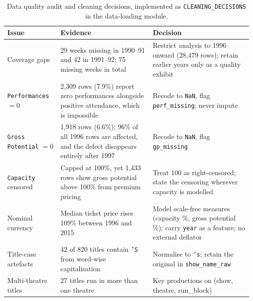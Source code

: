 \documentclass[11pt,a4paper]{article}
\newcommand{\code}[1]{\texttt{\small #1}}
\begin{document}
\begin{table}[htbp]
\centering
\caption{Data quality audit and cleaning decisions, implemented as
\code{CLEANING\_DECISIONS} in the data-loading module.}
\label{tab:quality}
\small
\begin{tabular}{@{}p{2.9cm}p{4.6cm}p{6.4cm}@{}}
\toprule
\textbf{Issue} & \textbf{Evidence} & \textbf{Decision} \\
\midrule
Coverage gaps &
29 weeks missing in 1990--91 and 42 in 1991--92; 75 missing weeks in total &
Restrict analysis to 1996 onward (28{,}479 rows); retain earlier years only as
a quality exhibit \\[3pt]

\code{Performances} $=0$ &
2{,}309 rows (7.9\%) report zero performances alongside positive attendance,
which is impossible &
Recode to \code{NaN}, flag \code{perf\_missing}; never impute \\[3pt]

\code{Gross Potential} $=0$ &
1{,}918 rows (6.6\%); 96\% of all 1996 rows are affected, and the defect
disappears entirely after 1997 &
Recode to \code{NaN}, flag \code{gp\_missing} \\[3pt]

\code{Capacity} censored &
Capped at 100\%, yet 1{,}433 rows show gross potential above 100\% from
premium pricing &
Treat 100 as right-censored; state the censoring wherever capacity is modelled \\[3pt]

Nominal currency &
Median ticket price rises 109\% between 1996 and 2015 &
Model scale-free measures (capacity \%, gross potential \%); carry \code{year}
as a feature; no external deflator \\[3pt]

Title-case artefacts &
42 of 820 titles contain \code{'S} from word-wise capitalisation &
Normalise to \code{'s}; retain the original in \code{show\_name\_raw} \\[3pt]

Multi-theatre titles &
27 titles run in more than one theatre &
Key productions on (show, theatre, run\_block) \\
\bottomrule
\end{tabular}
\end{table}
\end{document}
